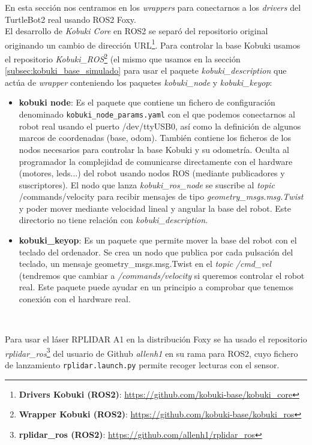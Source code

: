 En esta sección nos centramos en los \textit{wrappers} para conectarnos a los \textit{drivers} del TurtleBot2 real usando ROS2 Foxy.\\

El desarrollo de \textit{Kobuki Core} en ROS2 se separó del repositorio original originando un cambio de dirección URL\footnote{\textbf{Drivers Kobuki (ROS2)}: \url{https://github.com/kobuki-base/kobuki_core}}. Para controlar la base Kobuki usamos el repositorio \textit{Kobuki\_ROS}\footnote{\textbf{Wrapper Kobuki (ROS2)}: \url{https://github.com/kobuki-base/kobuki_ros}} (el mismo que usamos en la sección \ref{subsec:kobuki_base_simulado} para usar el paquete \textit{kobuki\_description} que actúa de \textit{wrapper} conteniendo los paquetes \textit{kobuki\_node} y \textit{kobuki\_keyop}:\\

\begin{itemize}
	\item \textbf{kobuki node}: Es el paquete que contiene un fichero de configuración denominado \texttt{kobuki\_node\_params.yaml} con el que podemos conectarnos al robot real usando el puerto /dev/ttyUSB0, así como la definición de algunos marcos de coordenadas (base, odom). También contiene los ficheros de los nodos necesarios para controlar la base Kobuki y su odometría. Oculta al programador la complejidad de comunicarse directamente con el hardware (motores, leds...) del robot usando nodos ROS (mediante publicadores y suscriptores). El nodo que lanza \textit{kobuki\_ros\_node} se suscribe al \textit{topic} /commands/velocity para recibir mensajes de tipo \textit{geometry\_msgs.msg.Twist} y poder mover mediante velocidad lineal y angular la base del robot. Este directorio no tiene relación con \textit{kobuki\_description}.
	\item \textbf{kobuki\_keyop}: Es un paquete que permite mover la base del robot con el teclado del ordenador. Se crea un nodo que publica por cada pulsación del teclado, un mensaje geometry\_msgs.msg.Twist en el \textit{topic} \textit{/cmd\_vel} (tendremos que cambiar a \textit{/commands/velocity} si queremos controlar el robot real. Este paquete puede ayudar en un principio a comprobar que tenemos conexión con el hardware real.
\end{itemize}\

Para usar el láser RPLIDAR A1 en la distribución Foxy se ha usado el repositorio \textit{rplidar\_ros}\footnote{\textbf{rplidar\_ros (ROS2)}: \url{https://github.com/allenh1/rplidar_ros}} del usuario de Github \textit{allenh1} en su rama para ROS2, cuyo fichero de lanzamiento \texttt{rplidar.launch.py} permite recoger lecturas con el sensor.\\

